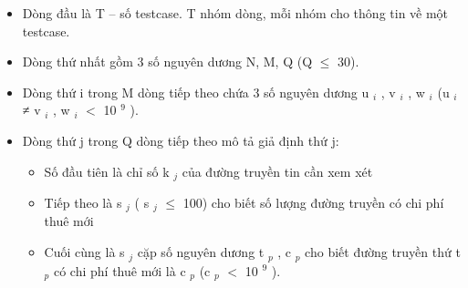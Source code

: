 \begin{itemize}
	\item Dòng đầu là T – số testcase. T nhóm dòng, mỗi nhóm cho thông tin về một testcase.
	\item Dòng thứ nhất gồm 3 số nguyên dương N, M, Q (Q  $\le$  30).
	\item Dòng thứ i trong M dòng tiếp theo chứa 3 số nguyên dương u $_ i $ , v $_ i $ , w $_ i $ (u $_ i $ ≠ v $_ i $ , w $_ i $ $<$ 10 $^ 9 $ ).
	\item Dòng thứ j trong Q dòng tiếp theo mô tả giả định thứ j:
\begin{itemize}
	\item Số đầu tiên là chỉ số k $_ j $ của đường truyền tin cần xem xét
	\item Tiếp theo là s $_ j $ ( s $_ j $  $\le$  100) cho biết số lượng đường truyền có chi phí thuê mới
	\item Cuối cùng là s $_ j $ cặp số nguyên dương t $_ p $ , c $_ p $ cho biết đường truyền thứ t $_ p $ có chi phí thuê mới là c $_ p $ (c $_ p $ $<$ 10 $^ 9 $ ).
\end{itemize}
\end{itemize}